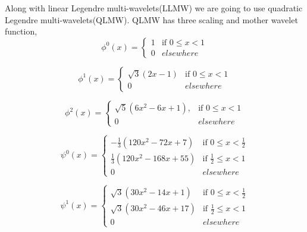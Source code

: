 Along with linear Legendre multi-wavelets(LLMW) we are going to use quadratic Legendre multi-wavelets(QLMW). QLMW has three scaling and mother wavelet function, 
\begin{equation}
\phi^0(x)=
\left\{
    \begin{array}{ll}
        1  & \mbox{if } 0 \leq x < 1 \\
        0 & elsewhere
    \end{array}
\right.
\end{equation}

\begin{equation}
\phi^1(x)=
\left\{
    \begin{array}{ll}
        \sqrt{3}(2x-1)  & \mbox{if } 0 \leq x < 1 \\
        0 & elsewhere
    \end{array}
\right.
\end{equation}

\begin{equation}
\phi^2(x)=
\left\{
    \begin{array}{ll}
        \sqrt{5}(6x^2-6x+1),  & \mbox{if } 0 \leq x < 1 \\
        0 & elsewhere
    \end{array}
\right.
\end{equation}

\begin{equation}
\psi^0(x)=
\left\{
    \begin{array}{ll}
        -\frac{1}{3}(120x^2-72x+7)  & \mbox{if } 0 \leq x < \frac{1}{2} \\
        \frac{1}{3}(120x^2-168x+55)  & \mbox{if } \frac{1}{2} \leq x < 1 \\
        0 & elsewhere
    \end{array}
\right.
\end{equation}

\begin{equation}
\psi^1(x)=
\left\{
    \begin{array}{ll}
        \sqrt{3}(30x^2-14x+1)  & \mbox{if } 0 \leq x < \frac{1}{2} \\
        \sqrt{3}(30x^2-46x+17)  & \mbox{if } \frac{1}{2} \leq x < 1 \\
        0 & elsewhere
    \end{array}
\right.
\end{equation}

